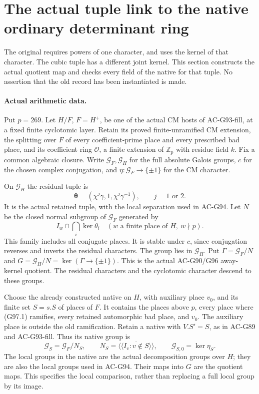 \section{The actual tuple link to the native ordinary determinant ring}
\label{sec:cubic-tuple-native-link}

The original  requires powers of one character,
and  uses the kernel of that character.  The cubic
tuple has a different joint kernel.  This section constructs the
actual quotient map and checks every field of the native
 for that tuple.  No assertion that the old
 record has been instantiated is made.

\paragraph{Actual arithmetic data.}
Put \(p=269\).  Let \(H/F\), \(F=H^+\), be one of the
actual CM hosts of AC-G93-fill, at a fixed finite cyclotomic
layer.  Retain its proved finite-unramified CM extension,
the splitting over \(F\) of every coefficient-prime place and
every prescribed bad place, and its coefficient ring
\(\mathcal O\), a finite extension of \(\mathbb Z_p\) with
residue field \(k\).  Fix a common algebraic closure.
Write \(\mathcal G_F,\mathcal G_H\) for the full absolute
Galois groups, \(c\) for the chosen complex conjugation, and
\(\eta:\mathcal G_F\to\{\pm1\}\) for the CM character.

On \(\mathcal G_H\) the residual tuple is
\[
 \boldsymbol\theta=(\bar\chi^j\gamma,1,
                         \bar\chi^j\gamma^{-1}),\qquad j=1\text{ or }2.
 \tag{G97.1}
\]
It is the actual retained tuple, with the local separation
used in AC-G94.  Let \(N\) be the closed normal subgroup
of \(\mathcal G_F\) generated by
\[
 I_w\cap\bigcap_i\ker\theta_i
       \quad(w\text{ a finite place of }H,\ w\nmid p).
 \tag{G97.2}
\]
This family includes all conjugate places.  It is stable under
\(c\), since conjugation reverses and inverts the residual
characters.  The group lies in \(\mathcal G_H\).
Put \(\Gamma=\mathcal G_F/N\) and
\(G=\mathcal G_H/N=\ker(\Gamma\to\{\pm1\})\).
This is the actual AC-G90/G96 away-kernel quotient.
The residual characters and the cyclotomic character descend
to these groups.

Choose the already constructed native  on
\(H\), with auxiliary place \(v_0\), and its finite set
\(S=s.S\) of places of \(F\).  It contains the places above
\(p\), every place where (G97.1) ramifies, every retained
automorphic bad place, and \(v_0\).  The auxiliary place is
outside the old ramification.  Retain a native 
with \(V.S'=S\), as in AC-G89 and AC-G93-fill.
Thus its native group is
\[
 \mathcal G_S=\mathcal G_F/N_S,
 \qquad N_S=\overline{\langle\!\langle I_v:v\notin S\rangle\!\rangle},
 \qquad \mathcal G_{S,0}=\ker\eta_S .
 \tag{G97.3}
\]
The local groups in the native  are the actual
decomposition groups over \(H\); they are also the local
groups used in AC-G94.  Their maps into \(G\) are the
quotient maps.  This specifies the local comparison, rather
than replacing a full local group by its image.

